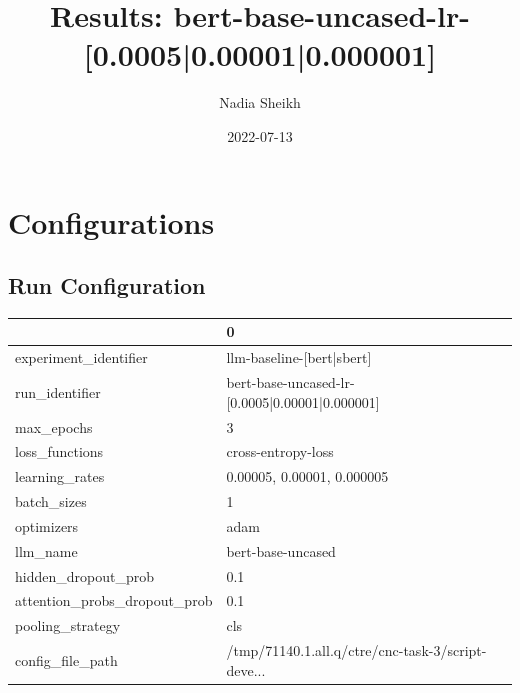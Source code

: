 \documentclass{article}
\title{Results: bert-base-uncased-lr-[0.0005|0.00001|0.000001]}
\author{Nadia Sheikh}
\date{2022-07-13}
\begin{document}
\maketitle
\section{Configurations}
\subsection{Run Configuration}
\begin{tabular}{ll}
\toprule
{} &                                                  0 \\
\midrule
experiment\_identifier        &                          llm-baseline-[bert|sbert] \\
run\_identifier               &     bert-base-uncased-lr-[0.0005|0.00001|0.000001] \\
max\_epochs                   &                                                  3 \\
loss\_functions               &                                 cross-entropy-loss \\
learning\_rates               &                         0.00005, 0.00001, 0.000005 \\
batch\_sizes                  &                                                  1 \\
optimizers                   &                                               adam \\
llm\_name                     &                                  bert-base-uncased \\
hidden\_dropout\_prob          &                                                0.1 \\
attention\_probs\_dropout\_prob &                                                0.1 \\
pooling\_strategy             &                                                cls \\
config\_file\_path             &  /tmp/71140.1.all.q/ctre/cnc-task-3/script-deve... \\
\bottomrule
\end{tabular}
\end{document}
